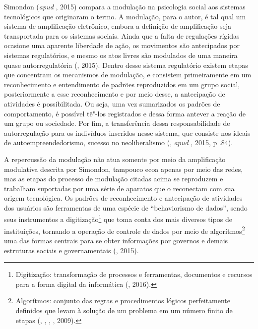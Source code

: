Simondon (\emph{apud} , 2015) compara a modulação na psicologia social
aos sistemas tecnológicos que originaram o termo. A modulação, para o
autor, é tal qual um sistema de amplificação eletrônico, embora a
definição de amplificação seja transportada para os sistemas sociais.
Ainda que a falta de regulações rígidas ocasione uma aparente liberdade
de ação, os movimentos são antecipados por sistemas regulatórios, e
mesmo os atos livres são modulados de uma maneira quase autorregulatória
(, 2015). Dentro desse sistema regulatório existem etapas que
concentram os mecanismos de modulação, e consistem primeiramente em um
reconhecimento e entendimento de padrões reproduzidos em um grupo
social, posteriormente a esse reconhecimento e por meio desse, a
antecipação de atividades é possibilitada. Ou seja, uma vez sumarizados
os padrões de comportamento, é possível tê"-los registrados e dessa forma
antever a reação de um grupo ou sociedade. Por fim, a transferência
dessa responsabilidade de autorregulação para os indivíduos inseridos
nesse sistema, que consiste nos ideais de autoempreendedorismo, sucesso
no neoliberalismo (, \emph{apud} , 2015, p .84).

A repercussão da modulação não atua somente por meio da amplificação
modulativa descrita por Simondon, tampouco ecoa apenas por meio das
redes, mas as etapas do processo de modulação citadas acima se
reproduzem e trabalham suportadas por uma série de aparatos que o
reconectam com sua origem tecnológica. Os padrões de reconhecimento e
antecipação de atividades dos usuários são ferramentas de uma espécie de
``behaviorismo de dados'', sendo seus instrumentos a
digitização\footnote{Digitização: transformação de processos e
  ferramentas, documentos e recursos para a forma digital da informática
  (, 2016).} que toma conta dos mais diversos tipos de
instituições, tornando a operação de controle de dados por meio de
algorítmos\footnote{Algorítmos: conjunto das regras e procedimentos
  lógicos perfeitamente definidos que levam à solução de um problema em
  um número finito de etapas (, , , , 2009).} uma das formas centrais para se obter
informações por governos e demais estruturas sociais e governamentais
(, 2015).

